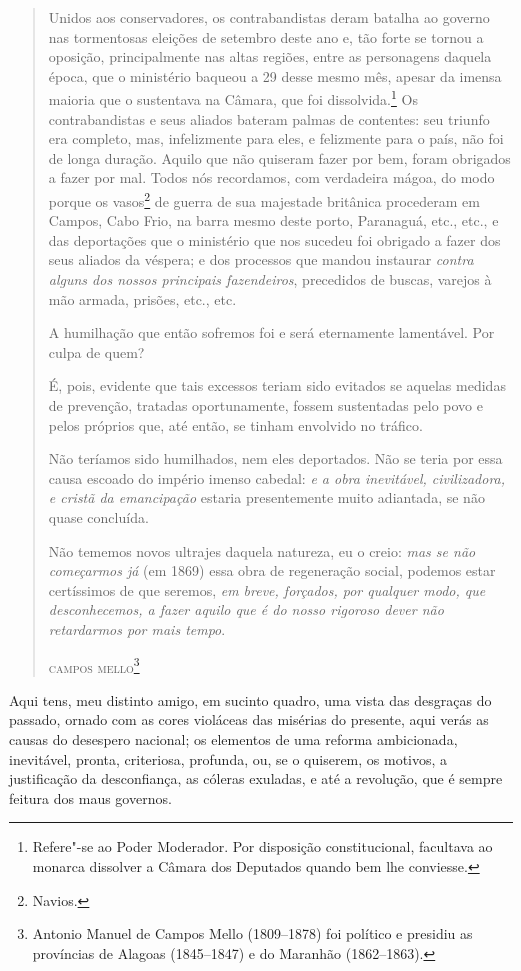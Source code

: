 \begin{quote}
Unidos aos conservadores, os contrabandistas deram batalha ao governo
nas tormentosas eleições de setembro deste ano e, tão forte se tornou a
oposição, principalmente nas altas regiões, entre as personagens daquela
época, que o ministério baqueou a 29 desse mesmo mês, apesar da imensa
maioria que o sustentava na Câmara, que foi dissolvida.\footnote{
  Refere"-se ao Poder Moderador. Por disposição constitucional,
  facultava ao monarca dissolver a Câmara dos Deputados quando bem lhe
  conviesse.} Os contrabandistas e seus aliados bateram palmas de
contentes: seu triunfo era completo, mas, infelizmente para eles, e
felizmente para o país, não foi de longa duração. Aquilo que não
quiseram fazer por bem, foram obrigados a fazer por mal. Todos nós
recordamos, com verdadeira mágoa, do modo porque os vasos\footnote{
  Navios.} de guerra de sua majestade britânica procederam em Campos,
Cabo Frio, na barra mesmo deste porto, Paranaguá, etc., etc., e das
deportações que o ministério que nos sucedeu foi obrigado a fazer dos
seus aliados da véspera; e dos processos que mandou instaurar
\emph{contra alguns dos nossos principais fazendeiros}, precedidos de
buscas, varejos à mão armada, prisões, etc., etc.

A humilhação que então sofremos foi e será eternamente lamentável. Por
culpa de quem?

É, pois, evidente que tais excessos teriam sido evitados se aquelas
medidas de prevenção, tratadas oportunamente, fossem sustentadas pelo
povo e pelos próprios que, até então, se tinham envolvido no tráfico.

Não teríamos sido humilhados, nem eles deportados. Não se teria por essa
causa escoado do império imenso cabedal: \emph{e a obra inevitável,
civilizadora, e cristã da emancipação} estaria presentemente muito
adiantada, se não quase concluída.

Não tememos novos ultrajes daquela natureza, eu o creio: \emph{mas se
não começarmos já} (em 1869) essa obra de regeneração social, podemos
estar certíssimos de que seremos, \emph{em breve, forçados, por qualquer
modo, que desconhecemos, a fazer aquilo que é do nosso rigoroso dever
não retardarmos por mais tempo}.

\hfill\textsc{campos mello}\footnote{Antonio Manuel de Campos Mello (1809--1878) foi
  político e presidiu as províncias de Alagoas (1845--1847) e do Maranhão
  (1862--1863).}
\end{quote}  

Aqui tens, meu distinto amigo, em sucinto quadro, uma vista das
desgraças do passado, ornado com as cores violáceas das misérias do
presente, aqui verás as causas do desespero nacional; os elementos de
uma reforma ambicionada, inevitável, pronta, criteriosa, profunda, ou,
se o quiserem, os motivos, a justificação da desconfiança, as cóleras
exuladas, e até a revolução, que é sempre feitura dos maus governos.

